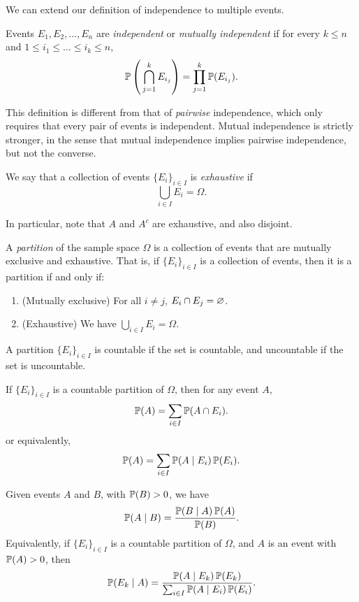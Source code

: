 We can extend our definition of independence to multiple events.
\begin{definition}
  Events $E_1, E_2, \dots, E_n$ are \emph{independent} or \emph{mutually independent} if for every $k \le n$ and $1 \le i_1 \le\dots \le i_k \le n$, \[
    \operatorname{\mathbb{P}} \left( \, \bigcap_{j = 1}^{k} E_{i_j} \right) = \prod_{j = 1}^{k} \operatorname{\mathbb{P}}(E_{i_j}).
  \] 
\end{definition}
\begin{remark}
  This definition is different from that of \emph{pairwise} independence, which only requires that every pair of events is independent. Mutual independence is strictly stronger, in the sense that mutual independence implies pairwise independence, but not the converse.
\end{remark}

\begin{definition}
We say that a collection of events $\{E_i\}_{i \in I}$ is \emph{exhaustive} if \[
    \bigcup_{i \in I} E_i = \Omega.
  \] 
\end{definition}

In particular, note that $A$ and $A^{c}$ are exhaustive, and also disjoint.

\begin{definition}
  A \emph{partition} of the sample space $\Omega$ is a collection of events that are mutually exclusive and exhaustive. That is, if $\{E_i\}_{i \in I}$ is a collection of events, then it is a partition if and only if: 
  \begin{enumerate}
    \item (Mutually exclusive) For all $i \neq j$, $E_i \cap E_j = \varnothing$.
    \item (Exhaustive) We have $\bigcup_{i \in I} E_i = \Omega$.
  \end{enumerate}
  A partition $\{E_i\}_{i \in I}$ is countable if the set is countable, and uncountable if the set is uncountable.
\end{definition}

\begin{proposition}
  If $\{E_i\}_{i \in I}$ is a countable partition of $\Omega$, then for any event $A$, \[
    \operatorname{\mathbb{P}}(A) = \sum_{i \in I} \operatorname{\mathbb{P}}(A \cap E_i).
  \] or equivalently, \[
    \operatorname{\mathbb{P}}(A) = \sum_{i \in I} \operatorname{\mathbb{P}}(A \mid E_i) \operatorname{\mathbb{P}}(E_i).
  \] 
\end{proposition}

\begin{proposition}
  Given events $A$ and $B$, with $\operatorname{\mathbb{P}}(B) > 0$, we have \[
    \operatorname{\mathbb{P}}(A \mid B) = \frac{\operatorname{\mathbb{P}}(B \mid A) \operatorname{\mathbb{P}}(A)}{\operatorname{\mathbb{P}}(B)}.
  \] Equivalently, if $\{E_i\}_{i \in I}$ is a countable partition of $\Omega$, and $A$ is an event with $\operatorname{\mathbb{P}}(A) > 0$, then \[
    \operatorname{\mathbb{P}}(E_k \mid A) = \frac{\operatorname{\mathbb{P}}(A \mid E_k) \operatorname{\mathbb{P}}(E_k)}{\sum_{i \in I} \operatorname{\mathbb{P}}(A \mid E_i) \operatorname{\mathbb{P}}(E_i)}.
  \] 
\end{proposition}


